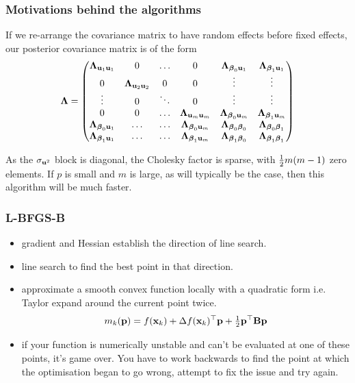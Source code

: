 \documentclass{beamer}
\begin{document}
\begin{frame}
	\frametitle{Motivations behind the algorithms}
	If we re-arrange the covariance matrix to have random effects before
	fixed effects, our posterior covariance matrix is of the form
	\begin{align*} {\boldsymbol\Lambda} =
		\begin{pmatrix}
		{\boldsymbol\Lambda}_{{\bf u}_1 {\bf u}_1}    & 0                      & \ldots & 0                          & {\boldsymbol \Lambda}_{{\boldsymbol \beta}_0 {\bf u}_1}    & {\boldsymbol \Lambda}_{{\boldsymbol \beta}_1 {\bf u}_1}    \\
		0                         & {\boldsymbol \Lambda}_{{\bf u}_2 {\bf u}_2} & 0      & 0                          & \vdots                       & \vdots                       \\
		\vdots                    & 0                      & \ddots & 0                          & \vdots                       & \vdots                       \\
		0                         & 0                      & \ldots & {\boldsymbol \Lambda}_{{\bf u}_{m} {\bf u}_{m}} & {\boldsymbol \Lambda}_{{\boldsymbol \beta}_0 {\bf u}_{m}}  & {\boldsymbol \Lambda}_{{\boldsymbol \beta}_1 {\bf u}_{m}}  \\
		{\boldsymbol \Lambda}_{{\boldsymbol \beta}_0 {\bf u}_1} & \ldots                 & \ldots & {\boldsymbol \Lambda}_{{\boldsymbol \beta}_0 {\bf u}_m}  & {\boldsymbol \Lambda}_{{\boldsymbol \beta}_0 {\boldsymbol \beta}_0} & {\boldsymbol \Lambda}_{{\boldsymbol \beta}_0 {\boldsymbol \beta}_1} \\
		{\boldsymbol \Lambda}_{{\boldsymbol \beta}_1 {\bf u}_1} & \ldots                 & \ldots & {\boldsymbol \Lambda}_{{\boldsymbol \beta}_1 {\bf u}_m}  & {\boldsymbol \Lambda}_{{\boldsymbol \beta}_1 {\boldsymbol \beta}_0} & {\boldsymbol \Lambda}_{{\boldsymbol \beta}_1 {\boldsymbol \beta}_1} 
		\end{pmatrix}
	\end{align*}
	
	As the $\sigma_{{\bf u}^2}$ block is diagonal, the Cholesky factor is 
	sparse, with $\tfrac{1}{2} m(m-1)$ zero elements. If $p$ is small
	and $m$ is large, as will typically be the case, then this algorithm will
	be much faster.
\end{frame}

\begin{frame}
	\frametitle{L-BFGS-B}
	\begin{itemize}
		\item gradient and Hessian establish the direction of line search.
		\item line search to find the best point in that direction.
		\item approximate a smooth convex function locally with a quadratic form i.e. Taylor expand around the current point twice.
			\[
				m_k({\bf p}) = f({\bf x}_k) + \Delta f({\bf x}_k)^\top {\bf p} + \tfrac{1}{2} {\bf p}^\top {\bf B} {\bf p}
			\]
		\item if your function is numerically unstable and can't be evaluated at one of these points, it's game over. You
		      have to work backwards to find the point at which the optimisation began to go wrong, attempt to fix the issue
		      and try again.
	\end{itemize}
\end{frame}
\end{document}
